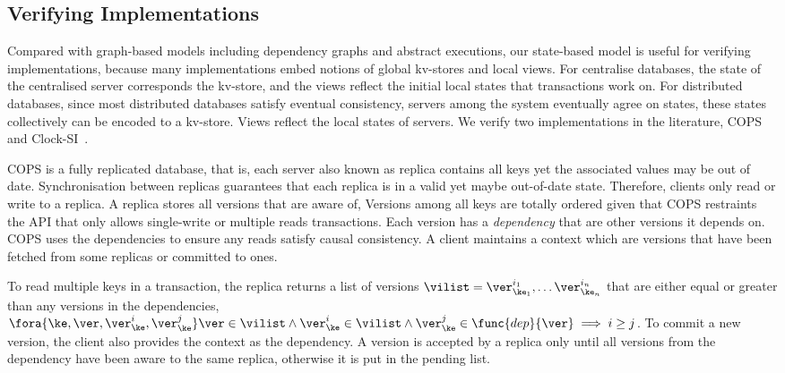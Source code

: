 \subsection{Verifying Implementations}
\label{sec:verify-impl}
Compared with graph-based models including dependency graphs and abstract executions,
our state-based model is useful for verifying implementations,
because many implementations embed notions of global kv-stores and local views.
For centralise databases, the state of the centralised server corresponds the kv-store,
and the views reflect the initial local states that transactions work on.
For distributed databases, since most distributed databases satisfy eventual consistency, 
\ie servers among the system eventually agree on states,
these states collectively can be encoded to a kv-store.
Views reflect the local states of servers.
We verify two implementations in the literature, 
COPS~\cite{Lloyd:2011:DSE:2043556.2043593} and Clock-SI~\cite{Du:2013:CSI:2553409.2553434}.

COPS is a fully replicated database, that is, 
each server also known as replica contains all keys yet the associated values may be out of date.
Synchronisation between replicas guarantees that each replica is in a valid yet maybe out-of-date state.
Therefore, clients only read or write to a replica.
A replica stores all versions that are aware of,
Versions among all keys are totally ordered given that
COPS restraints the API that only allows single-write or multiple reads transactions.
Each version has a \emph{dependency} that are other versions it depends on.
COPS uses the dependencies to ensure any reads satisfy causal consistency.
A client maintains a context which are versions 
that have been fetched from some replicas or committed to ones.

To read multiple keys in a transaction, the replica returns a list of versions \( \vilist = \ver^{i_1}_{\ke_1}, \dots \ver^{i_n}_{\ke_n} \) 
that are either equal or greater than any versions in the dependencies,
\ie \( \fora{\ke, \ver, \ver^{i}_{\ke}, \ver^{j}_{\ke}} \ver \in \vilist \land \ver^{i}_{\ke} \in \vilist \land \ver^{j}_{\ke} \in \func{dep}{\ver} \implies i \geq j \).
To commit a new version, the client also provides the context as the dependency.
A version is accepted by a replica
only until all versions from the dependency have been aware to the same replica,
otherwise it is put in the pending list.

